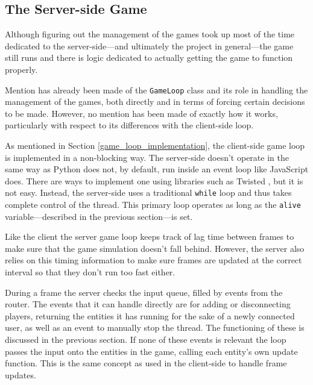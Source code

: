 \subsection{The Server-side Game}\label{server_movement}
Although figuring out the management of the games took up most of the time dedicated to the server-side---and ultimately the project in general---the game still runs and there is logic dedicated to actually getting the game to function properly.

Mention has already been made of the \texttt{GameLoop} class and its role in handling the management of the games, both directly and in terms of forcing certain decisions to be made. However, no mention has been made of exactly how it works, particularly with respect to its differences with the client-side loop.

As mentioned in Section \ref{game_loop_implementation}, the client-side game loop is implemented in a non-blocking way. The server-side doesn't operate in the same way as Python does not, by default, run inside an event loop like JavaScript does. There are ways to implement one using libraries such as Twisted \cite{citeulike:13161624}, but it is not easy. Instead, the server-side uses a traditional \texttt{while} loop and thus takes complete control of the thread. This primary loop operates as long as the \texttt{alive} variable---described in the previous section---is set.

Like the client the server game loop keeps track of lag time between frames to make sure that the game simulation doesn't fall behind. However, the server also relies on this timing information to make sure frames are updated at the correct interval so that they don't run too fast either.

During a frame the server checks the input queue, filled by events from the router. The events that it can handle directly are for adding or disconnecting players, returning the entities it has running for the sake of a newly connected user, as well as an event to manually stop the thread. The functioning of these is discussed in the previous section. If none of these events is relevant the loop passes the input onto the entities in the game, calling each entity's own update function. This is the same concept as used in the client-side to handle frame updates.

